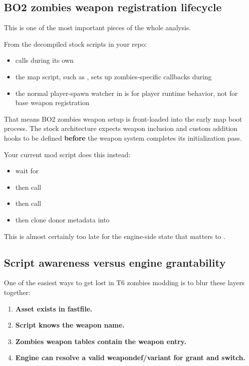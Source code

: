 \documentclass[11pt]{article}
\begin{document}
\subsection{BO2 zombies weapon registration lifecycle}

This is one of the most important pieces of the whole analysis.

From the decompiled stock scripts in your repo:

\begin{itemize}
  \item {} calls  during its own 
  \item the map script, such as , sets up zombies-specific callbacks during 
  \item the normal player-spawn watcher in  is for player runtime behavior, not for base weapon registration
\end{itemize}

That means BO2 zombies weapon setup is front-loaded into the early map boot process. The stock architecture expects weapon inclusion and custom addition hooks to be defined \textbf{before} the weapon system completes its initialization pass.

Your current mod script does this instead:

\begin{itemize}
  \item wait for 
  \item then call 
  \item then call 
  \item then clone donor metadata into 
\end{itemize}

This is almost certainly too late for the engine-side state that matters to .

\subsection{Script awareness versus engine grantability}

One of the easiest ways to get lost in T6 zombies modding is to blur these layers together:

\begin{enumerate}
  \item \textbf{Asset exists in fastfile.}
  \item \textbf{Script knows the weapon name.}
  \item \textbf{Zombies weapon tables contain the weapon entry.}
  \item \textbf{Engine can resolve a valid weapondef/variant for grant and switch.}
\end{enumerate}
\end{document}
